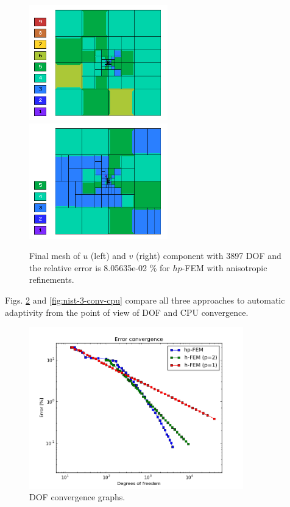 \documentclass[12pt]{elsarticle}
\begin{document}
\begin{figure}[!ht]
\centering
\includegraphics[height=5cm]{nist/nist-3/mesh_u_hp_anisoh.png}\ \
\includegraphics[height=5cm]{nist/nist-3/mesh_v_hp_anisoh.png}
\caption{Final mesh of $u$ (left) and $v$ (right) component with 3897 DOF and the
relative error is 8.05635e-02 \% for $hp$-FEM with anisotropic refinements.}
\label{fig:nist-3-hp-aniso}
\end{figure}

Figs. \ref{fig:nist-3-conv-dof} and \ref{fig:nist-3-conv-cpu} compare all
three approaches to automatic adaptivity from the point
of view of DOF and CPU convergence.

\begin{figure}[H]
\centering
\includegraphics[height=7cm]{nist/nist-3/conv_dof_aniso.png}
\caption{DOF convergence graphs.}
\label{fig:nist-3-conv-dof}
\end{figure}
\end{document}
